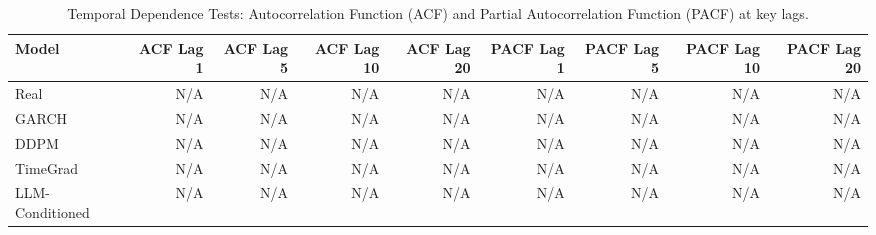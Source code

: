 \begin{table}[htbp]
\centering
\begin{tabular}{lrrrrrrrr}
\toprule
Model & ACF Lag 1 & ACF Lag 5 & ACF Lag 10 & ACF Lag 20 & PACF Lag 1 & PACF Lag 5 & PACF Lag 10 & PACF Lag 20 \\
\midrule
Real & N/A & N/A & N/A & N/A & N/A & N/A & N/A & N/A \\
GARCH & N/A & N/A & N/A & N/A & N/A & N/A & N/A & N/A \\
DDPM & N/A & N/A & N/A & N/A & N/A & N/A & N/A & N/A \\
TimeGrad & N/A & N/A & N/A & N/A & N/A & N/A & N/A & N/A \\
LLM-Conditioned & N/A & N/A & N/A & N/A & N/A & N/A & N/A & N/A \\
\bottomrule
\end{tabular}
\caption{Temporal Dependence Tests: Autocorrelation Function (ACF) and Partial Autocorrelation Function (PACF) at key lags.}
\label{tab:temporal_tests}
\end{table}